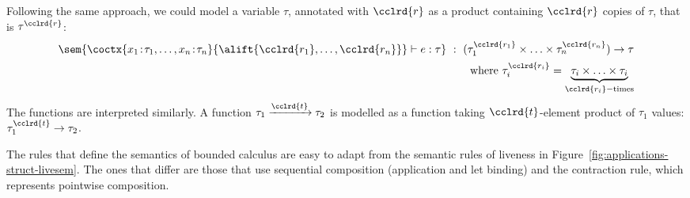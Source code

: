 Following the same approach, we could model a variable $\tau$, annotated with $\cclrd{r}$ as
a product containing $\cclrd{r}$ copies of $\tau$, that is $\tau^{\cclrd{r}}$:
%
\begin{equation*}
\begin{array}{r}
\sem{\coctx{x_1\!:\!\tau_1, \ldots, x_n\!:\!\tau_n}{ \alift{\cclrd{r_1}, \ldots, \cclrd{r_n}} } \vdash e : \tau}
  ~:~ (\tau^{\cclrd{r_1}}_1 \times \ldots \times \tau^{\cclrd{r_n}}_n) \rightarrow \tau\\[0.5em]
\textnormal{where}~\tau^{\cclrd{r_i}}_i = \underbrace{\tau_i \times \ldots \times \tau_i}_{\cclrd{r_i}-\text{times}}
\end{array}
\end{equation*}
%
The functions are interpreted similarly. A function $\tau_1 \xrightarrow{\cclrd{t}} \tau_2$ is modelled
as a function taking $\cclrd{t}$-element product of $\tau_1$ values: $\tau_1^{\cclrd{t}} \rightarrow \tau_2$.

The rules that define the semantics of bounded calculus are easy to adapt from the semantic rules
of liveness in Figure~\ref{fig:applications-struct-livesem}. The ones that differ are those that use
sequential composition (application and let binding) and the contraction rule, which represents
pointwise composition.

